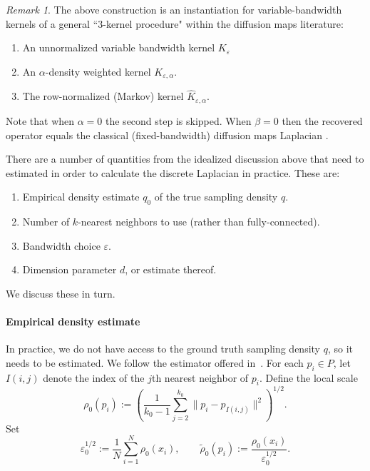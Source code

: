 \documentclass{article}
\theoremstyle{remark}
\newtheorem{remark}{Remark}
\theoremstyle{plain}
\begin{document}
\begin{remark}
The above construction is an instantiation for variable-bandwidth kernels of a general  ``3-kernel procedure" within the diffusion maps literature:
    \begin{enumerate}
        \item An unnormalized variable bandwidth kernel $K_\varepsilon^{}$
        \item An $\alpha$-density weighted kernel $K_{\varepsilon,\alpha}^{}$. 
        \item The row-normalized (Markov) kernel $\hat{K}_{\varepsilon,\alpha}$.
    \end{enumerate} 
    Note that when $\alpha=0$ the second step is skipped. When $\beta = 0$ then the recovered operator equals the classical (fixed-bandwidth) diffusion maps Laplacian \cite{coifman2006diffusion}.
\end{remark}




There are a number of quantities from the idealized discussion above that need to estimated in order to calculate the discrete Laplacian in practice. These are:
\begin{enumerate}
    \item Empirical density estimate $q_0$ of the true sampling density $q$. 
    \item Number of \( k \)-nearest neighbors to use (rather than fully-connected).
    \item Bandwidth choice $\varepsilon$.
    \item Dimension parameter $d$, or estimate thereof. 
\end{enumerate}
We discuss these in turn.

\paragraph{Empirical density estimate} In practice, we do not have access to the ground truth sampling density $q$, so it needs to be estimated. We follow the estimator offered in~\cite{Berry2016}. For each $p_i \in P$, let $I(i,j)$ denote the index of the $j$th nearest neighbor of $p_i$.
Define the local scale
\[
\rho_0(p_i)
:=
\left(
\frac{1}{k_0-1}\sum_{j=2}^{k_0} \|p_i-p_{I(i,j)}\|^2
\right)^{1/2}.
\]
Set
\[
\varepsilon_0^{1/2}
:=
\frac{1}{N}\sum_{i=1}^N \rho_0(x_i),
\qquad
\widetilde{\rho}_0(p_i)
:=
\frac{\rho_0(x_i)}{\varepsilon_0^{1/2}}.
\]

\end{document}
